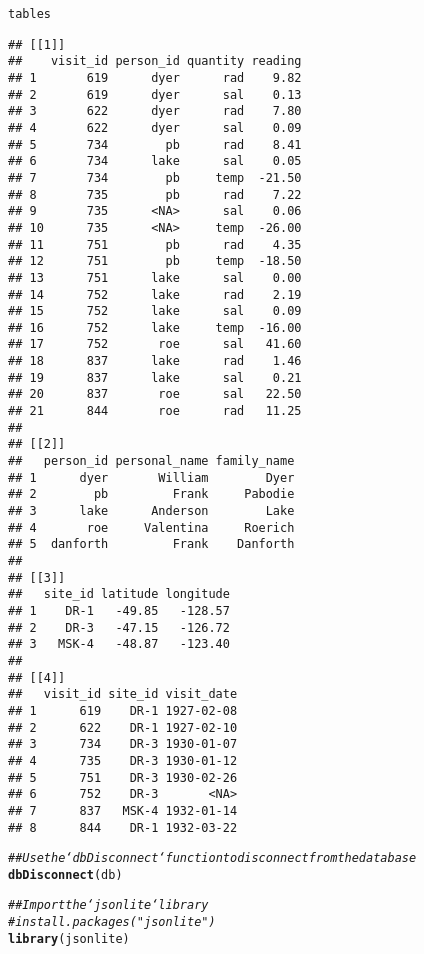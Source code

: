 \documentclass{article}\usepackage[]{graphicx}\usepackage[]{xcolor}
\makeatletter
\newcommand{\hlcom}[1]{\textcolor[rgb]{0.678,0.584,0.686}{\textit{#1}}}%
\newcommand{\hlstd}[1]{\textcolor[rgb]{0.345,0.345,0.345}{#1}}%
\newcommand{\hlkwd}[1]{\textcolor[rgb]{0.737,0.353,0.396}{\textbf{#1}}}%
\newenvironment{kframe}{%
 \def\at@end@of@kframe{}%
 \ifinner\ifhmode%
  \def\at@end@of@kframe{\end{minipage}}%
  \begin{minipage}{\columnwidth}%
 \fi\fi%
 \def\FrameCommand##1{\hskip\@totalleftmargin \hskip-\fboxsep
 \colorbox{shadecolor}{##1}\hskip-\fboxsep
     \hskip-\linewidth \hskip-\@totalleftmargin \hskip\columnwidth}%
 \MakeFramed {\advance\hsize-\width
   \@totalleftmargin\z@ \linewidth\hsize
   \@setminipage}}%
 {\par\unskip\endMakeFramed%
 \at@end@of@kframe}
\newenvironment{knitrout}{}{} %
\makeatother
\begin{document}
\begin{knitrout}
\begin{kframe}
{\ttfamily\noindent\color{warningcolor}{\#\# Warning: Column `reading`: mixed type, first seen values of type real, coercing other values of type string}}\begin{alltt}
\hlstd{tables}
\end{alltt}
\begin{verbatim}
## [[1]]
##    visit_id person_id quantity reading
## 1       619      dyer      rad    9.82
## 2       619      dyer      sal    0.13
## 3       622      dyer      rad    7.80
## 4       622      dyer      sal    0.09
## 5       734        pb      rad    8.41
## 6       734      lake      sal    0.05
## 7       734        pb     temp  -21.50
## 8       735        pb      rad    7.22
## 9       735      <NA>      sal    0.06
## 10      735      <NA>     temp  -26.00
## 11      751        pb      rad    4.35
## 12      751        pb     temp  -18.50
## 13      751      lake      sal    0.00
## 14      752      lake      rad    2.19
## 15      752      lake      sal    0.09
## 16      752      lake     temp  -16.00
## 17      752       roe      sal   41.60
## 18      837      lake      rad    1.46
## 19      837      lake      sal    0.21
## 20      837       roe      sal   22.50
## 21      844       roe      rad   11.25
## 
## [[2]]
##   person_id personal_name family_name
## 1      dyer       William        Dyer
## 2        pb         Frank     Pabodie
## 3      lake      Anderson        Lake
## 4       roe     Valentina     Roerich
## 5  danforth         Frank    Danforth
## 
## [[3]]
##   site_id latitude longitude
## 1    DR-1   -49.85   -128.57
## 2    DR-3   -47.15   -126.72
## 3   MSK-4   -48.87   -123.40
## 
## [[4]]
##   visit_id site_id visit_date
## 1      619    DR-1 1927-02-08
## 2      622    DR-1 1927-02-10
## 3      734    DR-3 1930-01-07
## 4      735    DR-3 1930-01-12
## 5      751    DR-3 1930-02-26
## 6      752    DR-3       <NA>
## 7      837   MSK-4 1932-01-14
## 8      844    DR-1 1932-03-22
\end{verbatim}
\begin{alltt}
\hlcom{## Use the `dbDisconnect` function to disconnect from the database}
\hlkwd{dbDisconnect}\hlstd{(db)}

\hlcom{## Import the `jsonlite` library}
\hlcom{#install.packages("jsonlite")}
\hlkwd{library}\hlstd{(jsonlite)}


\end{alltt}
\end{kframe}
\end{knitrout}
\end{document}
